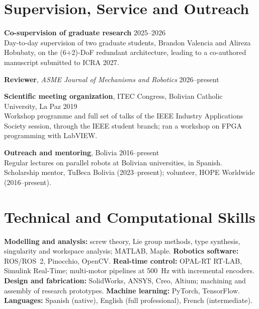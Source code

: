 \documentclass[11pt,letterpaper]{article}
\newenvironment{items}{\begin{list}{}{%
  \setlength{\leftmargin}{1.4em}\setlength{\itemindent}{-0.4em}
  \setlength{\itemsep}{0.5pt}\setlength{\parsep}{0pt}\setlength{\topsep}{1pt}}}%
  {\end{list}}
\newcommand{\dateline}[1]{\hfill{\footnotesize\color{cap} #1}}
\newcommand{\venue}[1]{\emph{#1}}
\begin{document}
\section{Supervision, Service and Outreach}
\begin{items}
\item[] \textbf{Co-supervision of graduate research} \dateline{2025--2026}\\
{\footnotesize Day-to-day supervision of two graduate students, Brandon Valencia and Alireza Hobubaty, on the (6+2)-DoF redundant architecture, leading to a co-authored manuscript submitted to ICRA 2027.}
\item[] \textbf{Reviewer}, \venue{ASME Journal of Mechanisms and Robotics} \dateline{2026--present}
\item[] \textbf{Scientific meeting organization}, ITEC Congress, Bolivian Catholic University, La Paz \dateline{2019}\\
{\footnotesize Workshop programme and full set of talks of the IEEE Industry Applications Society session, through the
IEEE student branch; ran a workshop on FPGA programming with LabVIEW.}
\item[] \textbf{Outreach and mentoring}, Bolivia \dateline{2016--present}\\
{\footnotesize Regular lectures on parallel robots at Bolivian universities, in Spanish. Scholarship mentor, TuBeca
Bolivia (2023--present); volunteer, HOPE Worldwide (2016--present).}
\end{items}

\section{Technical and Computational Skills}
{\footnotesize
\textbf{Modelling and analysis:} screw theory, Lie group methods, type synthesis, singularity and workspace analysis;
MATLAB, Maple. \quad \textbf{Robotics software:} ROS/ROS~2, Pinocchio, OpenCV. \quad
\textbf{Real-time control:} OPAL-RT RT-LAB, Simulink Real-Time; multi-motor pipelines at 500~Hz with incremental
encoders. \quad \textbf{Design and fabrication:} SolidWorks, ANSYS, Creo, Altium; machining and assembly of research
prototypes. \quad \textbf{Machine learning:} PyTorch, TensorFlow. \quad \textbf{Languages:} Spanish (native), English
(full professional), French (intermediate).}
\end{document}

